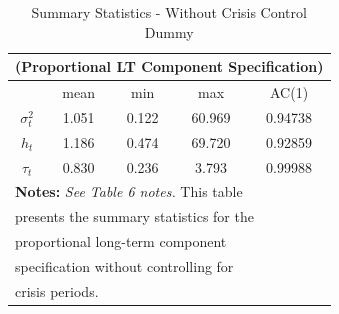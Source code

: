 \documentclass[12pt]{article}
\begin{document}
\begin{table}[!ht]
\centering
\caption{Summary Statistics - Without Crisis Control Dummy}
\begin{tabular}{ccccc}
\multicolumn{5}{c}{(Proportional LT Component Specification)}\\
\midrule
\midrule
\mbox{} & mean & min & max & AC(1)\\
\midrule
\mbox{$\sigma^2_t$}& 1.051 & 0.122 & 60.969 & 0.94738\\
\mbox{$h_t$} & 1.186 & 0.474 & 69.720 & 0.92859\\
\mbox{$\tau_t$} & 0.830 & 0.236 & 3.793 & 0.99988\\
\midrule
\multicolumn{5}{l}{\textbf{Notes:} \textit{See Table 6 notes.} This table}\\
\multicolumn{5}{l}{presents the summary statistics for the}\\
\multicolumn{5}{l}{proportional long-term component}\\
\multicolumn{5}{l}{specification without controlling for}\\
\multicolumn{5}{l}{crisis periods.}\\
\midrule
\midrule
\end{tabular}
\end{table}
\end{document}

